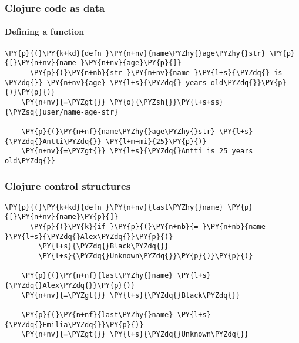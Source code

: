 \begin{frame}[fragile]
  \frametitle{Clojure code as data}
  \framesubtitle{Defining a function}

  \begin{Verbatim}[commandchars=\\\{\}]
    \PY{p}{(}\PY{k+kd}{defn }\PY{n+nv}{name\PYZhy{}age\PYZhy{}str} \PY{p}{[}\PY{n+nv}{name }\PY{n+nv}{age}\PY{p}{]}
      \PY{p}{(}\PY{n+nb}{str }\PY{n+nv}{name }\PY{l+s}{\PYZdq{} is \PYZdq{}} \PY{n+nv}{age} \PY{l+s}{\PYZdq{} years old\PYZdq{}}\PY{p}{)}\PY{p}{)}
    \PY{n+nv}{=\PYZgt{}} \PY{o}{\PYZsh{}}\PY{l+s+ss}{\PYZsq{}user/name-age-str}

    \PY{p}{(}\PY{n+nf}{name\PYZhy{}age\PYZhy{}str} \PY{l+s}{\PYZdq{}Antti\PYZdq{}} \PY{l+m+mi}{25}\PY{p}{)}
    \PY{n+nv}{=\PYZgt{}} \PY{l+s}{\PYZdq{}Antti is 25 years old\PYZdq{}}
  \end{Verbatim}
\end{frame}


\begin{frame}[fragile]
  \frametitle{Clojure control structures}

  \begin{Verbatim}[commandchars=\\\{\}]
    \PY{p}{(}\PY{k+kd}{defn }\PY{n+nv}{last\PYZhy{}name} \PY{p}{[}\PY{n+nv}{name}\PY{p}{]}
      \PY{p}{(}\PY{k}{if }\PY{p}{(}\PY{n+nb}{= }\PY{n+nb}{name }\PY{l+s}{\PYZdq{}Alex\PYZdq{}}\PY{p}{)}
        \PY{l+s}{\PYZdq{}Black\PYZdq{}}
        \PY{l+s}{\PYZdq{}Unknown\PYZdq{}}\PY{p}{)}\PY{p}{)}

    \PY{p}{(}\PY{n+nf}{last\PYZhy{}name} \PY{l+s}{\PYZdq{}Alex\PYZdq{}}\PY{p}{)}
    \PY{n+nv}{=\PYZgt{}} \PY{l+s}{\PYZdq{}Black\PYZdq{}}

    \PY{p}{(}\PY{n+nf}{last\PYZhy{}name} \PY{l+s}{\PYZdq{}Emilia\PYZdq{}}\PY{p}{)}
    \PY{n+nv}{=\PYZgt{}} \PY{l+s}{\PYZdq{}Unknown\PYZdq{}}
  \end{Verbatim}
\end{frame}


